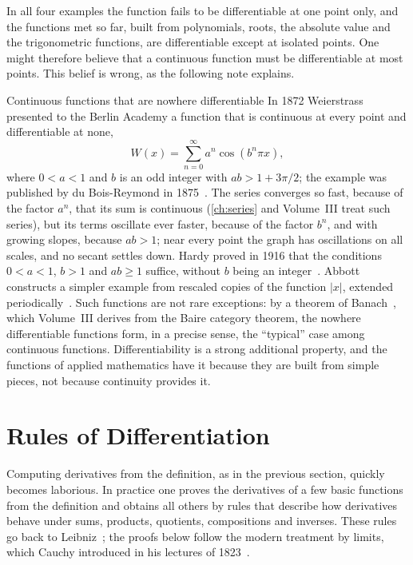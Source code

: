 In all four examples the function fails to be differentiable at one point only, and the functions met so far, built from polynomials, roots, the absolute value and the trigonometric functions, are differentiable except at isolated points. One might therefore believe that a continuous function must be differentiable at most points. This belief is wrong, as the following note explains.

\begin{note}{Continuous functions that are nowhere differentiable}
In 1872 Weierstrass presented to the Berlin Academy a function that is continuous at every point and differentiable at none,
\[
W(x)=\sum_{n=0}^\infty a^n\cos(b^n\pi x),
\]
where $0<a<1$ and $b$ is an odd integer with $ab>1+3\pi/2$; the example was published by du Bois-Reymond in 1875~\cite{duboisreymond1875}. The series converges so fast, because of the factor $a^n$, that its sum is continuous (\cref{ch:series} and Volume~III treat such series), but its terms oscillate ever faster, because of the factor $b^n$, and with growing slopes, because $ab>1$; near every point the graph has oscillations on all scales, and no secant settles down. Hardy proved in 1916 that the conditions $0<a<1$, $b>1$ and $ab\ge1$ suffice, without $b$ being an integer~\cite{hardy1916}. Abbott constructs a simpler example from rescaled copies of the function $|x|$, extended periodically~\cite{abbott2015}. Such functions are not rare exceptions: by a theorem of Banach~\cite{banach1931}, which Volume~III derives from the Baire category theorem, the nowhere differentiable functions form, in a precise sense, the ``typical'' case among continuous functions. Differentiability is a strong additional property, and the functions of applied mathematics have it because they are built from simple pieces, not because continuity provides it.
\end{note}

\section{Rules of Differentiation}
\label{sec:rules}

Computing derivatives from the definition, as in the previous section, quickly becomes laborious. In practice one proves the derivatives of a few basic functions from the definition and obtains all others by rules that describe how derivatives behave under sums, products, quotients, compositions and inverses. These rules go back to Leibniz~\cite{leibniz1684}; the proofs below follow the modern treatment by limits, which Cauchy introduced in his lectures of 1823~\cite{cauchy1823,grabiner1981}.

